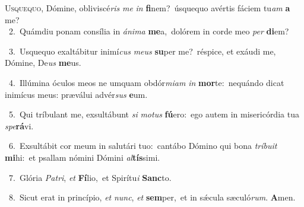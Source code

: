 \lettrine{\initial\textcolor{\initialcolor}{U}}{squequo,} Dómine, obliviscé\textit{ris} \textit{me} \textit{in} \textbf{fi}\-nem?~\star úsquequo avértis fáciem tu\textit{am} \textbf{a} me?\\
{\numbfont\textcolor{\numbcolor}{~2.}}~Quámdiu ponam consília in \textit{á}\-\textit{ni}\textit{ma} \textbf{me}\-a,~\star dolórem in corde meo \textit{per} \textbf{di}\-em?\par
{\numbfont\textcolor{\numbcolor}{~3.}}~Usquequo exaltábitur inimí\textit{cus} \textit{me}\-\textit{us} \textbf{su}\-per me?~\star réspice, et exáudi me, Dómine, De\textit{us} \textbf{me}\-us.\par
{\numbfont\textcolor{\numbcolor}{~4.}}~Illúmina óculos meos ne umquam obdór\-\textit{mi}\-\textit{am} \textit{in} \textbf{mor}\-te:~\star nequándo dicat inimícus meus: præválui advér\textit{sus} \textbf{e}\-um.\par
{\numbfont\textcolor{\numbcolor}{~5.}}~Qui tríbulant me, exsultábunt \textit{si} \textit{mo}\-\textit{tus} \textbf{fú}\-ero:~\star ego autem in misericórdia tua \textit{spe}\-\textbf{rá}vi.\par
{\numbfont\textcolor{\numbcolor}{~6.}}~Exsultábit cor meum in salutári tuo:~\dagger cantábo Dómino qui bona \textit{trí}\-\textit{bu}\textit{it} \textbf{mi}\-hi:~\star et psallam nómini Dómini \textit{al}\-\textbf{tís}simi.\par
{\numbfont\textcolor{\numbcolor}{~7.}}~Glória \textit{Pa}\-\textit{tri}, \textit{et} \textbf{Fí}\-lio,~\star et Spirítu\textit{i} \textbf{Sanc}\-to.\par
{\numbfont\textcolor{\numbcolor}{~8.}}~Sicut erat in princípio, \textit{et} \textit{nunc}\-, \textit{et} \textbf{sem}\-per,~\star et in sǽcula sæculó\-\textit{rum}\-. \textbf{A}\-men.\par
